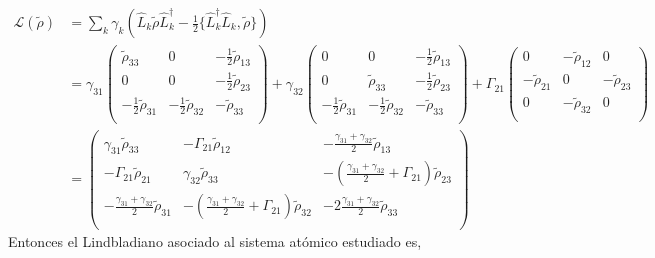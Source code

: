 \begin{equation}
\begin{split}
    \mathcal{L}(\tilde{\rho}) &= \sum_k \gamma_k \left( \hat{L}_k \tilde{\rho} \hat{L}_k^{\dagger} - \frac{1}{2} \{\hat{L}_k^{\dagger} \hat{L}_k, \tilde{\rho}\} \right)\\
    &= \gamma_{31} \begin{pmatrix}
     \tilde{\rho}_{33} & 0 &  - \frac{1}{2} \tilde{\rho}_{13} \\
        0 & 0 &  - \frac{1}{2} \tilde{\rho}_{23} \\
         - \frac{1}{2}  \tilde{\rho}_{31} &   - \frac{1}{2} \tilde{\rho}_{32} &  - \tilde{\rho}_{33} \\
    \end{pmatrix} + \gamma_{32} \begin{pmatrix}
        0 & 0 &  - \frac{1}{2} \tilde{\rho}_{13} \\
        0 & \tilde{\rho}_{33} &  - \frac{1}{2} \tilde{\rho}_{23} \\
         - \frac{1}{2}  \tilde{\rho}_{31} &   - \frac{1}{2} \tilde{\rho}_{32} &  - \tilde{\rho}_{33} \\
    \end{pmatrix} +  \Gamma_{21} \begin{pmatrix}
       0 & - \tilde{\rho}_{12} & 0 \\
        -\tilde{\rho}_{21} &  0 &  -\tilde{\rho}_{23} \\
        0 & -\tilde{\rho}_{32} & 0 \\ 
    \end{pmatrix} \\
    &= \begin{pmatrix}
     \gamma_{31} \tilde{\rho}_{33} &  - \Gamma_{21} \tilde{\rho}_{12} &  - \frac{\gamma_{31} + \gamma_{32}}{2} \tilde{\rho}_{13} \\
        - \Gamma_{21} \tilde{\rho}_{21} & \gamma_{32} \tilde{\rho}_{33} &  - \left(\frac{\gamma_{31} + \gamma_{32}}{2}  + \Gamma_{21} \right)\tilde{\rho}_{23} \\
         - \frac{\gamma_{31} + \gamma_{32}}{2}  \tilde{\rho}_{31} &   - \left( \frac{\gamma_{31} + \gamma_{32}}{2} +  \Gamma_{21} \right)\tilde{\rho}_{32} &  - 2 \frac{\gamma_{31} + \gamma_{32}}{2}\tilde{\rho}_{33} \\
    \end{pmatrix}
\end{split}
\end{equation}
Entonces el Lindbladiano asociado al sistema atómico estudiado es,
